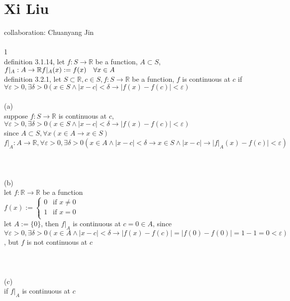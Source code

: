 \documentclass[12pt, border = 4pt, multi]{article} %
\begin{document}
\section*{Xi Liu}
collaboration: Chuanyang Jin\\
\\
1\\
definition 3.1.14, let $f: S \rightarrow \mathbb{R}$ be a function, $A \subset S$, $f|_A: A \rightarrow \mathbb{R}\\
f|_A(x) := f(x) \quad \forall x \in A$\\
definition 3.2.1, let $S \subset \mathbb{R}, c \in S, f: S \rightarrow \mathbb{R}$ be a function, $f$ is continuous at $c$ if $\forall \varepsilon > 0, \exists \delta > 0(x \in S \wedge |x - c| < \delta \rightarrow |f(x) - f(c)| < \varepsilon)$\\
\\
(a)\\
suppose $f: S \rightarrow \mathbb{R}$ is continuous at $c$, $\forall \varepsilon > 0, \exists \delta > 0(x \in S \wedge |x - c| < \delta \rightarrow |f(x) - f(c)| < \varepsilon)$\\
since $A \subset S, \forall x(x \in A \rightarrow x \in S)$\\
$f|_A: A \rightarrow \mathbb{R}, \forall \varepsilon > 0, \exists \delta > 0(x \in A \wedge |x - c| < \delta \rightarrow x \in S \wedge |x - c| \rightarrow |f|_A(x) - f(c)| < \varepsilon)$\\
\\
\\
\\
(b)\\
let $f: \mathbb{R} \rightarrow \mathbb{R}$ be a function\\
$f(x) :=
\begin{cases}
0 & \text{if } x \not= 0\\
1 & \text{if } x = 0\\
\end{cases}$\\
let $A := \{0\}$, then $f|_A$ is continuous at $c = 0 \in A$, since $\forall \varepsilon > 0, \exists \delta > 0(x \in A \wedge |x - c| < \delta \rightarrow |f(x) - f(c)| = |f(0) - f(0)| = 1 - 1 = 0 < \varepsilon)$, but $f$ is not continuous at $c$\\
\\
\\
\\
(c)\\
if $f|_A$ is continuous at $c$\\
\end{document}
